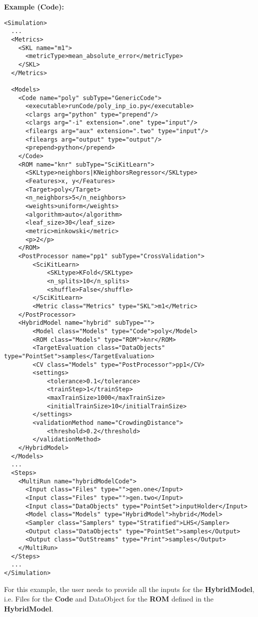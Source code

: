 \textbf{Example (Code):}
\begin{lstlisting}[style=XML,morekeywords={subType,debug,repeat,name,class,type}]
<Simulation>
  ...
  <Metrics>
    <SKL name="m1">
      <metricType>mean_absolute_error</metricType>
    </SKL>
  </Metrics>

  <Models>
    <Code name="poly" subType="GenericCode">
      <executable>runCode/poly_inp_io.py</executable>
      <clargs arg="python" type="prepend"/>
      <clargs arg="-i" extension=".one" type="input"/>
      <fileargs arg="aux" extension=".two" type="input"/>
      <fileargs arg="output" type="output"/>
      <prepend>python</prepend>
    </Code>
    <ROM name="knr" subType="SciKitLearn">
      <SKLtype>neighbors|KNeighborsRegressor</SKLtype>
      <Features>x, y</Features>
      <Target>poly</Target>
      <n_neighbors>5</n_neighbors>
      <weights>uniform</weights>
      <algorithm>auto</algorithm>
      <leaf_size>30</leaf_size>
      <metric>minkowski</metric>
      <p>2</p>
    </ROM>
    <PostProcessor name="pp1" subType="CrossValidation">
        <SciKitLearn>
            <SKLtype>KFold</SKLtype>
            <n_splits>10</n_splits>
            <shuffle>False</shuffle>
        </SciKitLearn>
        <Metric class="Metrics" type="SKL">m1</Metric>
    </PostProcessor>
    <HybridModel name="hybrid" subType="">
        <Model class="Models" type="Code">poly</Model>
        <ROM class="Models" type="ROM">knr</ROM>
        <TargetEvaluation class="DataObjects" type="PointSet">samples</TargetEvaluation>
        <CV class="Models" type="PostProcessor">pp1</CV>
        <settings>
            <tolerance>0.1</tolerance>
            <trainStep>1</trainStep>
            <maxTrainSize>1000</maxTrainSize>
            <initialTrainSize>10</initialTrainSize>
        </settings>
        <validationMethod name="CrowdingDistance">
            <threshold>0.2</threshold>
        </validationMethod>
    </HybridModel>
  </Models>
  ...
  <Steps>
    <MultiRun name="hybridModelCode">
      <Input class="Files" type="">gen.one</Input>
      <Input class="Files" type="">gen.two</Input>
      <Input class="DataObjects" type="PointSet">inputHolder</Input>
      <Model class="Models" type="HybridModel">hybrid</Model>
      <Sampler class="Samplers" type="Stratified">LHS</Sampler>
      <Output class="DataObjects" type="PointSet">samples</Output>
      <Output class="OutStreams" type="Print">samples</Output>
    </MultiRun>
  </Steps>
  ...
</Simulation>
\end{lstlisting}
%
\nb For this example, the user needs to provide all the inputs for the \textbf{HybridModel}, i.e. Files for the
\textbf{Code} and DataObject for the \textbf{ROM} defined in the \textbf{HybridModel}.




